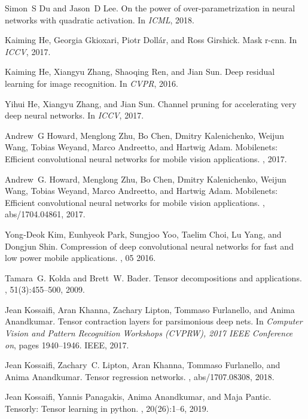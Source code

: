 \documentclass[10pt,twocolumn,letterpaper]{article}
\begin{document}
{\begin{thebibliography}{10}
Simon~S Du and Jason~D Lee.
\newblock On the power of over-parametrization in neural networks with
  quadratic activation.
\newblock In {\em ICML}, 2018.

Kaiming He, Georgia Gkioxari, Piotr Doll{\'a}r, and Ross Girshick.
\newblock Mask r-cnn.
\newblock In {\em ICCV}, 2017.

Kaiming He, Xiangyu Zhang, Shaoqing Ren, and Jian Sun.
\newblock Deep residual learning for image recognition.
\newblock In {\em CVPR}, 2016.

Yihui He, Xiangyu Zhang, and Jian Sun.
\newblock Channel pruning for accelerating very deep neural networks.
\newblock In {\em ICCV}, 2017.

Andrew~G Howard, Menglong Zhu, Bo Chen, Dmitry Kalenichenko, Weijun Wang,
  Tobias Weyand, Marco Andreetto, and Hartwig Adam.
\newblock Mobilenets: Efficient convolutional neural networks for mobile vision
  applications.
, 2017.

Andrew~G. Howard, Menglong Zhu, Bo Chen, Dmitry Kalenichenko, Weijun Wang,
  Tobias Weyand, Marco Andreetto, and Hartwig Adam.
\newblock Mobilenets: Efficient convolutional neural networks for mobile vision
  applications.
, abs/1704.04861, 2017.

Yong{-}Deok Kim, Eunhyeok Park, Sungjoo Yoo, Taelim Choi, Lu Yang, and Dongjun
  Shin.
\newblock Compression of deep convolutional neural networks for fast and low
  power mobile applications.
, 05 2016.

Tamara~G. Kolda and Brett~W. Bader.
\newblock Tensor decompositions and applications.
, 51(3):455--500, 2009.

Jean Kossaifi, Aran Khanna, Zachary Lipton, Tommaso Furlanello, and Anima
  Anandkumar.
\newblock Tensor contraction layers for parsimonious deep nets.
\newblock In {\em Computer Vision and Pattern Recognition Workshops (CVPRW),
  2017 IEEE Conference on}, pages 1940--1946. IEEE, 2017.

Jean Kossaifi, Zachary~C. Lipton, Aran Khanna, Tommaso Furlanello, and Anima
  Anandkumar.
\newblock Tensor regression networks.
, abs/1707.08308, 2018.

Jean Kossaifi, Yannis Panagakis, Anima Anandkumar, and Maja Pantic.
\newblock Tensorly: Tensor learning in python.
, 20(26):1--6, 2019.


\end{thebibliography}}
\end{document}
